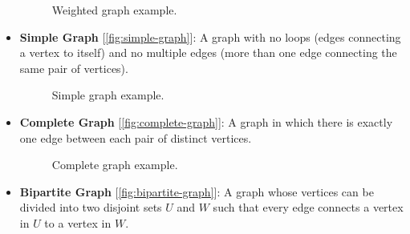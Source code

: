 \documentclass{article}
\begin{document}
\begin{itemize}
\begin{figure}[H]
    \caption{Weighted graph example.}
    \label{fig:weighted-graph}
    \end{figure}
    
    \item \textbf{Simple Graph} [\autoref{fig:simple-graph}]: A graph with no loops (edges connecting a vertex to itself) and no multiple edges (more than one edge connecting the same pair of vertices).
    
    \begin{figure}[H]
    \centering
    \caption{Simple graph example.}
    \label{fig:simple-graph}
    \end{figure}
    
    \item \textbf{Complete Graph} [\autoref{fig:complete-graph}]: A graph in which there is exactly one edge between each pair of distinct vertices.
    
    \begin{figure}[H]
    \centering
    \caption{Complete graph example.}
    \label{fig:complete-graph}
    \end{figure}

    
    \item \textbf{Bipartite Graph} [\autoref{fig:bipartite-graph}]: A graph whose vertices can be divided into two disjoint sets $U$ and $W$ such that every edge connects a vertex in $U$ to a vertex in $W$.
    

\end{itemize}
\end{document}

